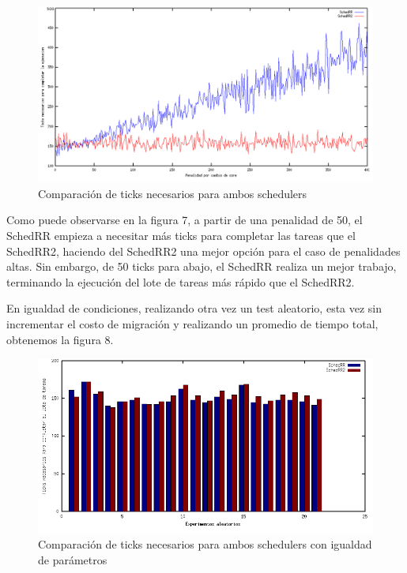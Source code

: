\documentclass[a4paper,10pt,twoside]{article}
\begin{document}
\begin{figure}[ht!]
\centering
\includegraphics[width=175mm]{../ejercicio8/compTicksSched.png}
\caption{Comparación de ticks necesarios para ambos schedulers}
\label{overflow}
\end{figure}

Como puede observarse en la figura 7, a partir de una penalidad de 50, el SchedRR empieza a necesitar más ticks para completar las tareas que el SchedRR2, haciendo del SchedRR2 una mejor opción para el caso de penalidades altas. Sin embargo, de 50 ticks para abajo, el SchedRR realiza un mejor trabajo, terminando la ejecución del lote de tareas más rápido que el SchedRR2.

En igualdad de condiciones, realizando otra vez un test aleatorio, esta vez sin incrementar el costo de migración y realizando un promedio de tiempo total, obtenemos la figura 8.

\begin{figure}[ht!]
\centering
\includegraphics[width=175mm]{../ejercicio8/comTicksSchedIgualdad.png}
\caption{Comparación de ticks necesarios para ambos schedulers con igualdad de parámetros}
\label{overflow}
\end{figure}
\end{document}
